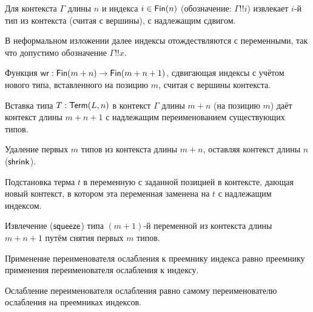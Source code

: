 \begin{definition}
Для контекста $\Gamma$ длины $n$ и индекса
$i \in \mathsf{Fin}(n)$ (обозначение: $\Gamma \mathbin{!!} i$)
извлекает $i$-й тип из контекста (считая с вершины),
с надлежащим сдвигом.
\end{definition}

В неформальном изложении далее индексы отождествляются
с переменными, так что допустимо обозначение
$\Gamma\mathbin{!!}x$.

\begin{definition}
Функция $\mathsf{wr} : \mathsf{Fin}(m+n) \to \mathsf{Fin}(m+n+1)$,
сдвигающая индексы с учётом нового типа, вставленного
на позицию $m$, считая с вершины контекста.
\end{definition}

\begin{definition}
Вставка типа $T:\mathsf{Term}(L,n)$ в контекст $\Gamma$ длины
$m+n$ (на позицию $m$) даёт контекст длины $m+n+1$
с надлежащим переименованием существующих типов.
\end{definition}

\begin{definition}
Удаление первых $m$ типов из контекста длины $m+n$,
оставляя контекст длины $n$ ($\mathsf{shrink}$).
\end{definition}

\begin{definition}
Подстановка терма $t$ в переменную с заданной позицией
в контексте, дающая новый контекст, в котором эта
переменная заменена на $t$ с надлежащим индексом.
\end{definition}

\begin{definition}
Извлечение ($\mathsf{squeeze}$) типа $(m+1)$-й переменной из
контекста длины $m+n+1$ путём снятия первых $m$ типов.
\end{definition}

\begin{lemma}
Применение переименователя ослабления к преемнику
индекса равно преемнику применения переименователя
ослабления к индексу.
\end{lemma}

\begin{lemma}
Ослабление переименователя ослабления равно
самому переименователю ослабления на преемниках
индексов.
\end{lemma}

